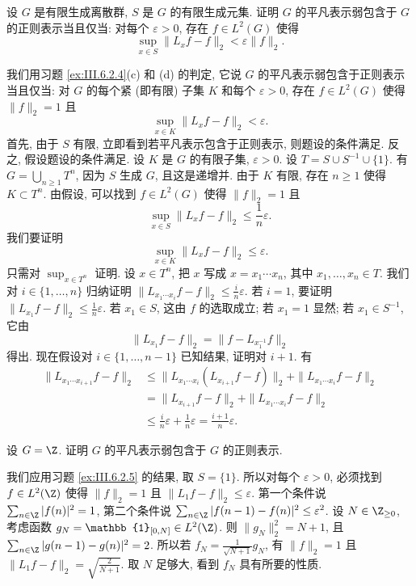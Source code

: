 \begin{exercise}[有限生成离散群]
\label{ex:III.6.2.5}
设 $G$ 是有限生成离散群, $S$ 是 $G$ 的有限生成元集. 证明 $G$ 的平凡表示弱包含于 $G$ 的正则表示当且仅当: 对每个 $\varepsilon > 0$, 存在 $f \in L^2(G)$ 使得
\[
\sup_{x \in S}\|L_xf - f\|_2 < \varepsilon\|f\|_2.
\]
\end{exercise}

\begin{solution}
我们用习题 \ref{ex:III.6.2.4}(c) 和 (d) 的判定, 它说 $G$ 的平凡表示弱包含于正则表示当且仅当: 对 $G$ 的每个紧 (即有限) 子集 $K$ 和每个 $\varepsilon > 0$, 存在 $f \in L^2(G)$ 使得 $\|f\|_2 = 1$ 且
\[
\sup_{x \in K}\|L_xf - f\|_2 < \varepsilon.
\]
首先, 由于 $S$ 有限, 立即看到若平凡表示包含于正则表示, 则题设的条件满足.
反之, 假设题设的条件满足. 设 $K$ 是 $G$ 的有限子集, $\varepsilon > 0$. 设 $T = S \cup S^{-1} \cup \{1\}$. 有 $G = \bigcup_{n \geq 1}T^n$, 因为 $S$ 生成 $G$, 且这是递增并. 由于 $K$ 有限, 存在 $n \geq 1$ 使得 $K \subset T^n$. 由假设, 可以找到 $f \in L^2(G)$ 使得 $\|f\|_2 = 1$ 且
\[
\sup_{x \in S}\|L_xf - f\|_2 \leq \frac{1}{n}\varepsilon.
\]
我们要证明
\[
\sup_{x \in K}\|L_xf - f\|_2 \leq \varepsilon.
\]
只需对 $\sup_{x \in T^n}$ 证明. 设 $x \in T^n$, 把 $x$ 写成 $x = x_1\cdots x_n$, 其中 $x_1, \ldots, x_n \in T$. 我们对 $i \in \{1, \ldots, n\}$ 归纳证明 $\|L_{x_1\cdots x_i}f - f\|_2 \leq \frac{i}{n}\varepsilon$. 若 $i = 1$, 要证明 $\|L_{x_1}f - f\|_2 \leq \frac{1}{n}\varepsilon$. 若 $x_1 \in S$, 这由 $f$ 的选取成立; 若 $x_1 = 1$ 显然; 若 $x_1 \in S^{-1}$, 它由
\[
\|L_{x_1}f - f\|_2 = \|f - L_{x_1^{-1}}f\|_2
\]
得出. 现在假设对 $i \in \{1, \ldots, n-1\}$ 已知结果, 证明对 $i+1$. 有
\begin{align*}
\|L_{x_1\cdots x_{i+1}}f - f\|_2 &\leq \|L_{x_1\cdots x_i}(L_{x_{i+1}}f - f)\|_2 + \|L_{x_1\cdots x_i}f - f\|_2 \\
&= \|L_{x_{i+1}}f - f\|_2 + \|L_{x_1\cdots x_i}f - f\|_2 \\
&\leq \frac{i}{n}\varepsilon + \frac{1}{n}\varepsilon = \frac{i+1}{n}\varepsilon.
\end{align*}
\end{solution}

\begin{exercise}[$G = \Z$ 的情形]
\label{ex:III.6.2.6}
设 $G = \Z$. 证明 $G$ 的平凡表示弱包含于 $G$ 的正则表示.
\end{exercise}

\begin{solution}
我们应用习题 \ref{ex:III.6.2.5} 的结果, 取 $S = \{1\}$. 所以对每个 $\varepsilon > 0$, 必须找到 $f \in L^2(\Z)$ 使得 $\|f\|_2 = 1$ 且 $\|L_1f - f\|_2 \leq \varepsilon$. 第一个条件说 $\sum_{n \in \Z}|f(n)|^2 = 1$, 第二个条件说 $\sum_{n \in \Z}|f(n-1) - f(n)|^2 \leq \varepsilon^2$. 设 $N \in \Z_{\geq 0}$, 考虑函数 $g_N = \mathbb{1}_{[0,N]} \in L^2(\Z)$. 则 $\|g_N\|_2^2 = N + 1$, 且 $\sum_{n \in \Z}|g(n-1) - g(n)|^2 = 2$. 所以若 $f_N = \frac{1}{\sqrt{N+1}}g_N$, 有 $\|f\|_2 = 1$ 且 $\|L_1f - f\|_2 = \sqrt{\frac{2}{N+1}}$. 取 $N$ 足够大, 看到 $f_N$ 具有所要的性质.
\end{solution}


